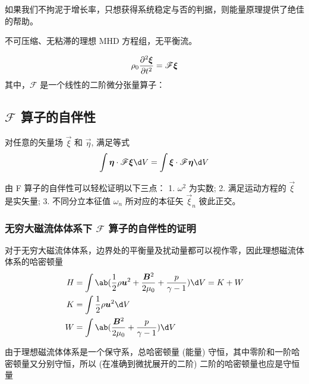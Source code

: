 如果我们不拘泥于增长率，只想获得系统稳定与否的判据，则能量原理提供了绝佳的帮助。

不可压缩、无粘滞的理想 MHD 方程组，无平衡流。

\begin{equation}
\rho_0 \pdv[2]{\bm{\xi}}{t} = \mathscr{F} \bm{\xi}
\end{equation}
其中，$\mathscr{F}$ 是一个线性的二阶微分张量算子：

\subsection{\texorpdfstring{$\mathscr{F}$}{F} 算子的自伴性}

对任意的矢量场 $\vec{\xi}$ 和 $\vec{\eta}$, 满足等式
\begin{equation}
\int \vec{\eta} \cdot \mathscr{F} \vec{\xi} \d V
= \int \vec{\xi} \cdot \mathscr{F} \vec{\eta} \d V
\end{equation}

由 F 算子的自伴性可以轻松证明以下三点：
1. $\omega^2$ 为实数;
2. 满足运动方程的 $\vec{\xi}$ 是实矢量;
3. 不同分立本征值 $\omega_n$ 所对应的本征矢 $\vec{\xi}_n$ 彼此正交。

\subsubsection{无穷大磁流体体系下 \texorpdfstring{$\mathscr{F}$}{F} 算子的自伴性的证明}

对于无穷大磁流体体系，边界处的平衡量及扰动量都可以视作零，因此理想磁流体体系的哈密顿量
\begin{subequations}\begin{align}
H &= \int \ab(
    \frac12 \rho \vec{u}^2
    + \frac{\vec{B}^2}{2\mu_0}
    + \frac{p}{\gamma - 1}
) \d V
= K + W \\
K &= \int \frac12 \rho \vec{u}^2 \d V \\
W &= \int \ab(
    \frac{\vec{B}^2}{2\mu_0}
    + \frac{p}{\gamma - 1}
) \d V
\end{align}\end{subequations}

由于理想磁流体体系是一个保守系，总哈密顿量 (能量) 守恒，其中零阶和一阶哈密顿量又分别守恒，所以 (在准确到微扰展开的二阶) 二阶的哈密顿量也应是守恒量

